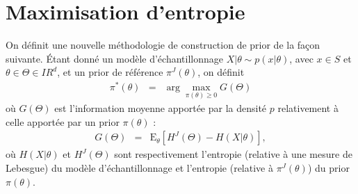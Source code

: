\documentclass[10pt]{article}
\newcommand{\R}{I\!\!R}
\newcommand{\E}{\mbox{E}}
\newcommand{\1}{\mathbbm{1}}
\begin{document}
\section{Maximisation d'entropie }\label{max.entropie}

On définit une nouvelle méthodologie de construction de prior de la fa\c con suivante. \'Etant donné un modèle d'échantillonnage $X|\theta \sim p(x|\theta)$, avec $x\in S$ et $\theta\in\Theta\in\R^d$, et un prior de référence $\pi^J(\theta)$, on définit
\begin{eqnarray}
\pi^*(\theta) & = & \arg\max\limits_{\pi(\theta)\geq 0} G(\Theta) \label{mdiprior}
\end{eqnarray}
où $G(\Theta)$ est l'information moyenne apportée par la densité $p$ relativement à celle apportée par un prior $\pi(\theta)$ :
\begin{eqnarray*}
G(\Theta) & = & \E_{\theta}\left[H^J(\Theta) - H(X|\theta)\right],
\end{eqnarray*}
où $H(X|\theta)$ et
$H^J(\Theta)$ sont respectivement l'entropie (relative à une mesure de Lebesgue) du modèle d'échantillonnage et l'entropie (relative à $\pi^J(\theta)$) du prior $\pi(\theta)$. 
\end{document}
